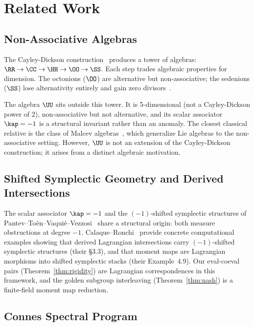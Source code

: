 \section*{Related Work}

\subsection*{Non-Associative Algebras}

The Cayley-Dickson construction~\cite{schafer} produces a tower of algebras: $\RR \to \CC \to \HH \to \OO \to \SS$. Each step trades algebraic properties for dimension. The octonions ($\OO$) are alternative but non-associative; the sedenions ($\SS$) lose alternativity entirely and gain zero divisors~\cite{baez-octonions}.

The algebra $\UU$ sits outside this tower. It is 5-dimensional (not a Cayley-Dickson power of 2), non-associative but not alternative, and its scalar associator $\kap = -1$ is a structural invariant rather than an anomaly. The closest classical relative is the class of Malcev algebras~\cite{malcev}, which generalize Lie algebras to the non-associative setting. However, $\UU$ is not an extension of the Cayley-Dickson construction; it arises from a distinct algebraic motivation.

\subsection*{Shifted Symplectic Geometry and Derived Intersections}

The scalar associator $\kap = -1$ and the $(-1)$-shifted symplectic structures of Pantev--To\"en--Vaqui\'e--Vezzosi~\cite{ptvv} share a structural origin: both measure obstructions at degree $-1$. Calaque--Ronchi~\cite{calaque-ronchi} provide concrete computational examples showing that derived Lagrangian intersections carry $(-1)$-shifted symplectic structures (their \S3.3), and that moment maps are Lagrangian morphisms into shifted symplectic stacks (their Example~4.9). Our eval-coeval pairs (Theorem~\ref{thm:rigidity}) are Lagrangian correspondences in this framework, and the golden subgroup interleaving (Theorem~\ref{thm:nash}) is a finite-field moment map reduction.

\subsection*{Connes Spectral Program}

